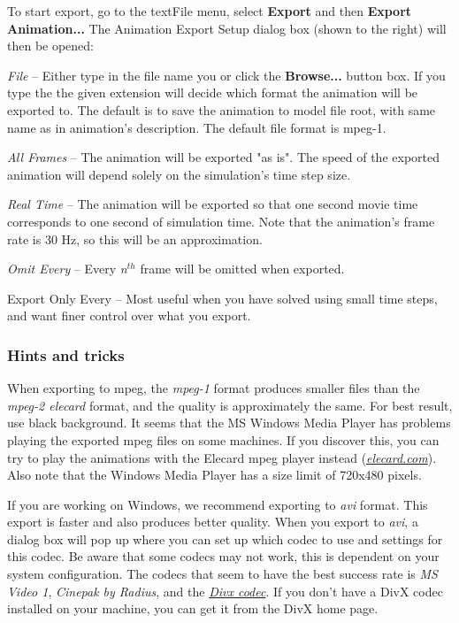 To start export, go to the text{File} menu, select \textbf{Export} and then
\textbf{Export Animation...} The Animation Export Setup dialog box
(shown to the right) will then be opened:

\begin{bulletlist}
\item{\sl File} --
  Either type in the file name you or click the \textbf{Browse...} button box.
  If you type the the given extension will decide which format the animation
  will be exported to. The default is to save the animation to model file root,
  with same name as in animation's description.
  The default file format is mpeg-1.
\end{bulletlist}

\begin{bulletlist}
   \setcounter{enumi}{1}
\item{\sl All Frames} --
  The animation will be exported "as is". The speed of the exported animation
  will depend solely on the simulation's time step size.
\item{\sl Real Time} --
  The animation will be exported so that one second movie time corresponds to
  one second of simulation time. Note that the animation's frame rate is 30 Hz,
  so this will be an approximation.
\item{\sl Omit Every} --
  Every {\sl n}$^{th}$ frame will be omitted when exported.
\item{Export Only Every} --
  Most useful when you have solved using small time steps,
  and want finer control over what you export.
\end{bulletlist}

\subsubsection{Hints and tricks}

When exporting to mpeg, the {\sl mpeg-1} format produces smaller files than the
{\sl mpeg-2 elecard} format, and the quality is approximately the same.
For best result, use black background.
It seems that the MS Windows Media Player has problems playing the exported
mpeg files on some machines. If you discover this, you can try to play the
animations with the Elecard mpeg player instead
(\href{https://www.elecard.com/}{\sl elecard.com}).
Also note that the Windows Media Player has a size limit of 720x480 pixels.

If you are working on Windows, we recommend exporting to {\sl avi} format.
This export is faster and also produces better quality. When you
export to {\sl avi}, a dialog box will pop up where you can set up
which codec to use and settings for this codec. Be aware that some
codecs may not work, this is dependent on your system configuration.
The codecs that seem to have the best success rate is {\sl MS Video 1},
{\sl Cinepak by Radius}, and the \href{https://www.divx.com/}{\sl Divx codec}.
If you don't have a DivX codec installed on your machine,
you can get it from the DivX home page.
